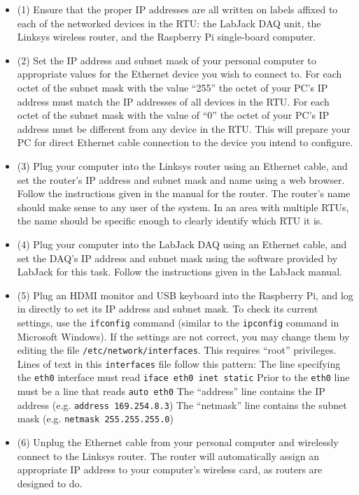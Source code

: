 \begin{itemize}
\item{(1)} Ensure that the proper IP addresses are all written on labels affixed to each of the networked devices in the RTU: the LabJack DAQ unit, the Linksys wireless router, and the Raspberry Pi single-board computer.
\vskip 10pt
\item{(2)} Set the IP address and subnet mask of your personal computer to appropriate values for the Ethernet device you wish to connect to.  For each octet of the subnet mask with the value ``255'' the octet of your PC's IP address must match the IP addresses of all devices in the RTU.  For each octet of the subnet mask with the value of ``0'' the octet of your PC's IP address must be different from any device in the RTU.  This will prepare your PC for direct Ethernet cable connection to the device you intend to configure.  
\vskip 10pt
\item{(3)} Plug your computer into the Linksys router using an Ethernet cable, and set the router's IP address and subnet mask and name using a web browser.  Follow the instructions given in the manual for the router.  The router's name should make sense to any user of the system.  In an area with multiple RTUs, the name should be specific enough to clearly identify which RTU it is.
\vskip 10pt
\item{(4)} Plug your computer into the LabJack DAQ using an Ethernet cable, and set the DAQ's IP address and subnet mask using the software provided by LabJack for this task.  Follow the instructions given in the LabJack manual.
\vskip 10pt
\item{(5)} Plug an HDMI monitor and USB keyboard into the Raspberry Pi, and log in directly to set its IP address and subnet mask.  To check its current settings, use the {\tt ifconfig} command (similar to the {\tt ipconfig} command in Microsoft Windows).  If the settings are not correct, you may change them by editing the file {\tt /etc/network/interfaces}.  This requires ``root'' privileges.  Lines of text in this {\tt interfaces} file follow this pattern:
\itemitem{} The line specifying the {\tt eth0} interface must read {\tt iface eth0 inet static}
\itemitem{} Prior to the {\tt eth0} line must be a line that reads {\tt auto eth0}
\itemitem{} The ``address'' line contains the IP address (e.g. {\tt address 169.254.8.3})
\itemitem{} The ``netmask'' line contains the subnet mask (e.g. {\tt netmask 255.255.255.0})
\vskip 10pt
\item{(6)} Unplug the Ethernet cable from your personal computer and wirelessly connect to the Linksys router.  The router will automatically assign an appropriate IP address to your computer's wireless card, as routers are designed to do.

\end{itemize}
